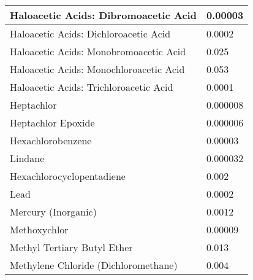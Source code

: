 \begin{table}[]
\begin{tabular}{|m{9cm}|m{5cm}|}
Haloacetic Acids: Dibromoacetic Acid                                & 0.00003                                                 \\ \hline
Haloacetic Acids: Dichloroacetic Acid                               & 0.0002                                                  \\ \hline
Haloacetic Acids: Monobromoacetic Acid                              & 0.025                                                   \\ \hline
Haloacetic Acids: Monochloroacetic Acid                             & 0.053                                                   \\ \hline
Haloacetic Acids: Trichloroacetic Acid                              & 0.0001                                                  \\ \hline
Heptachlor                                                          & 0.000008                                                \\ \hline
Heptachlor Epoxide                                                  & 0.000006                                                \\ \hline
Hexachlorobenzene                                                   & 0.00003                                                 \\ \hline
Lindane                                                             & 0.000032                                                \\ \hline
Hexachlorocyclopentadiene                                           & 0.002                                                   \\ \hline
Lead                                                                & 0.0002                                                  \\ \hline
Mercury (Inorganic)                                                 & 0.0012                                                  \\ \hline
Methoxychlor                                                        & 0.00009                                                 \\ \hline
Methyl Tertiary Butyl Ether                                         & 0.013                                                   \\ \hline
Methylene Chloride (Dichloromethane)                                & 0.004                                                   \\ \hline

\end{tabular}
\end{table}

